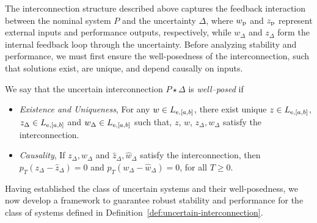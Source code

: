 The interconnection structure described above captures the feedback interaction
between the nominal system $P$ and the uncertainty $\Delta$, where $w_{{\mathrm{p}}}$ and $z_{{\mathrm{p}}}$
represent external inputs and performance outputs, respectively, while
$w_\Delta$ and $z_\Delta$ form the internal feedback loop through the
uncertainty.
Before analyzing stability and performance, we must first ensure the
well-posedness of the interconnection, such that solutions exist, are unique,
and depend causally on inputs.
\begin{definition}
We say that the uncertain interconnection $P\star\Delta$ is
\emph{well--posed} if
\begin{itemize}
\item \emph{Existence and Uniqueness}, For any
$w\in L_{{\mathrm{e}}, [a,b]}$, there exist unique
$z\in L_{{\mathrm{e}}, [a,b]}$,
$z_\Delta \in L_{{\mathrm{e}}, [a,b]}$ and
$w_\Delta \in  L_{{\mathrm{e}}, [a,b]}$ such that, $z$, $w$,
$z_\Delta, w_\Delta$ satisfy the interconnection.
\item \emph{Causality}, If $z_\Delta, w_\Delta$ and
$\hat{z}_\Delta, \hat{w}_\Delta$ satisfy the interconnection,
then $p_T(z_\Delta - \hat{z}_\Delta) = 0$ and
$p_T(w_\Delta - \hat{w}_\Delta) = 0$, for all
$T \geq 0$.
\end{itemize}
\end{definition}
Having established the class of uncertain systems and their well-posedness, we
now develop a framework to guarantee robust stability and performance for the
class of systems defined in Definition~\ref{def:uncertain-interconnection}.

\primalsystemcomponents


